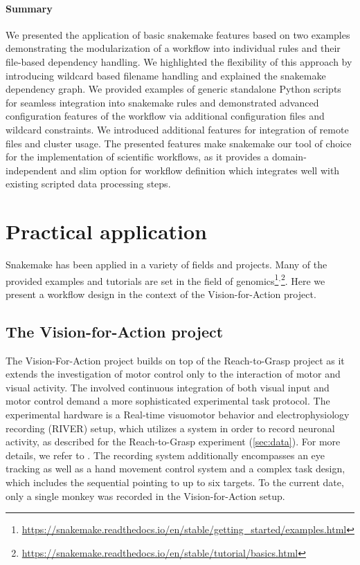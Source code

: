 \paragraph{Summary}
We presented the application of basic snakemake features based on two examples demonstrating the modularization of a workflow into individual rules and their file-based dependency handling. We highlighted the flexibility of this approach by introducing wildcard based filename handling and explained the snakemake dependency graph. We provided examples of generic standalone Python scripts for seamless integration into snakemake rules and demonstrated advanced configuration features of the workflow via additional configuration files and wildcard constraints. We introduced additional features for integration of remote files and cluster usage.
The presented features make snakemake our tool of choice for the implementation of scientific workflows, as it provides a domain-independent and slim option for workflow definition which integrates well with existing scripted data processing steps.


\section{Practical application}
Snakemake has been applied in a variety of fields and projects. Many of the provided examples and tutorials are set in the field of genomics\footnote{\url{https://snakemake.readthedocs.io/en/stable/getting_started/examples.html}}$^,$\footnote{\url{https://snakemake.readthedocs.io/en/stable/tutorial/basics.html}}. Here we present a workflow design in the context of the Vision-for-Action project.

\subsection{The Vision-for-Action project}
The Vision-For-Action project builds on top of the Reach-to-Grasp project as it extends the investigation of motor control only to the interaction of motor and visual activity. The involved continuous integration of both visual input and motor control demand a more sophisticated experimental task protocol. The experimental hardware is a Real-time visuomotor behavior and electrophysiology recording (RIVER) setup, which utilizes a  system in order to record neuronal activity, as described for the Reach-to-Grasp experiment (\cref{sec:data}). For more details, we refer to \citet{deHaan_2018,deHaan_2018a}. The recording system additionally encompasses an eye tracking as well as a hand movement control system and a complex task design, which includes the sequential pointing to up to six targets. To the current date, only a single monkey was recorded in the Vision-for-Action setup.

